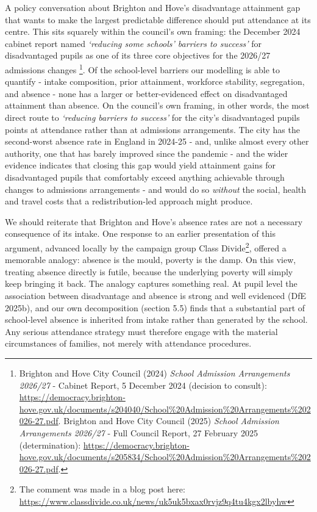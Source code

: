 \documentclass[
  12pt,
  titlepage]{article}
\begin{document}
A policy conversation about Brighton and Hove's disadvantage attainment
gap that wants to make the largest predictable difference should put
attendance at its centre. This sits squarely within the council's own
framing: the December 2024 cabinet report named \emph{`reducing some
schools' barriers to success'} for disadvantaged pupils as one of its
three core objectives for the 2026/27 admissions changes \footnote{Brighton
  and Hove City Council (2024) \emph{School Admission Arrangements
  2026/27} - Cabinet Report, 5 December 2024 (decision to consult):
  \url{https://democracy.brighton-hove.gov.uk/documents/s204040/School\%20Admission\%20Arrangements\%202026-27.pdf}.
  Brighton and Hove City Council (2025) \emph{School Admission
  Arrangements 2026/27} - Full Council Report, 27 February 2025
  (determination):
  \url{https://democracy.brighton-hove.gov.uk/documents/s205834/School\%20Admission\%20Arrangements\%202026-27.pdf}.}.
Of the school-level barriers our modelling is able to quantify - intake
composition, prior attainment, workforce stability, segregation, and
absence - none has a larger or better-evidenced effect on disadvantaged
attainment than absence. On the council's own framing, in other words,
the most direct route to \emph{`reducing barriers to success'} for the
city's disadvantaged pupils points at attendance rather than at
admissions arrangements. The city has the second-worst absence rate in
England in 2024-25 - and, unlike almost every other authority, one that
has barely improved since the pandemic - and the wider evidence
indicates that closing this gap would yield attainment gains for
disadvantaged pupils that comfortably exceed anything achievable through
changes to admissions arrangements - and would do so \emph{without} the
social, health and travel costs that a redistribution-led approach might
produce.

We should reiterate that Brighton and Hove's absence rates are not a
necessary consequence of its intake. One response to an earlier
presentation of this argument, advanced locally by the campaign group
Class Divide\footnote{The comment was made in a blog post here:
  \url{https://www.classdivide.co.uk/news/uk5uk5bxax0rvjz9q4tu4kgx2lbyhw}},
offered a memorable analogy: absence is the mould, poverty is the damp.
On this view, treating absence directly is futile, because the
underlying poverty will simply keep bringing it back. The analogy
captures something real. At pupil level the association between
disadvantage and absence is strong and well evidenced (DfE 2025b), and
our own decomposition (section 5.5) finds that a substantial part of
school-level absence is inherited from intake rather than generated by
the school. Any serious attendance strategy must therefore engage with
the material circumstances of families, not merely with attendance
procedures.
\end{document}
